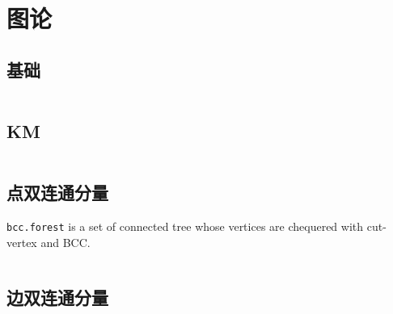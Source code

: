 \chapter{图论}
\section{基础}
\inputminted{cpp}{\source/graph-theory/basis.cpp}
\section{KM}
\inputminted{cpp}{\source/graph-theory/KM.cpp}
\section{点双连通分量}
\texttt{bcc.forest} is a set of connected tree whose vertices are chequered with cut-vertex and BCC.
\inputminted{cpp}{\source/graph-theory/biconnected-graph-vertex.cpp}
\section{边双连通分量}
\inputminted{cpp}{\source/graph-theory/biconnected-graph-edge.cpp}
